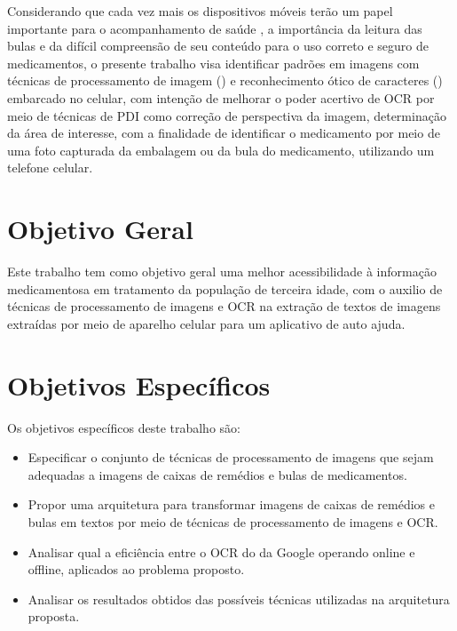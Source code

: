 Considerando que cada vez mais os dispositivos móveis terão um papel importante para o acompanhamento de saúde \cite{ESTADAOCELULAR}, a importância da leitura das bulas e da difícil compreensão de seu conteúdo para o uso correto e seguro de medicamentos, o presente trabalho visa identificar padrões em imagens com técnicas de processamento de imagem () e reconhecimento ótico de caracteres () embarcado no celular, com intenção de melhorar o poder acertivo de OCR por meio de técnicas de PDI como correção de perspectiva da imagem, determinação da área de interesse, com a finalidade de identificar o medicamento por meio de uma foto capturada da embalagem ou da bula do medicamento, utilizando um telefone celular.





\section{Objetivo Geral}

Este trabalho tem como objetivo geral uma melhor acessibilidade à informação medicamentosa em tratamento da população de terceira idade, com o auxilio de técnicas de processamento de imagens e OCR na extração de textos de imagens extraídas por meio de aparelho celular para um aplicativo de auto ajuda.



\section{Objetivos Específicos}
Os objetivos específicos deste trabalho são: 
\begin{itemize}
    
    \item Especificar o conjunto de técnicas de processamento de imagens que sejam adequadas a imagens de caixas de remédios e bulas de medicamentos.
	\item Propor uma arquitetura para transformar imagens de caixas de remédios e bulas em textos por meio de técnicas de processamento de imagens e OCR.
	\item Analisar qual a eficiência entre o OCR do  da Google operando online e offline, aplicados ao problema proposto.
	\item Analisar os resultados obtidos das possíveis técnicas utilizadas na arquitetura proposta.

\end{itemize}


